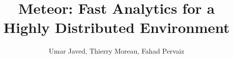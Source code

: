 \documentclass{article}
\begin{document}
\title{Meteor: Fast Analytics for a Highly Distributed Environment}
\author{Umar Javed, Thierry Moreau, Fahad Pervaiz}

\maketitle











\end{document}
